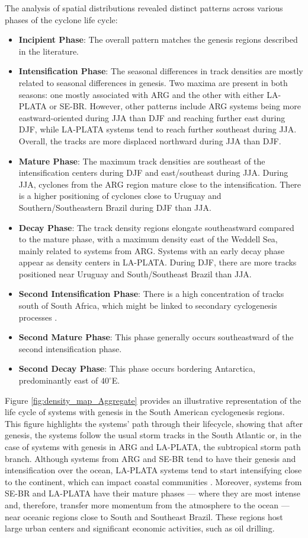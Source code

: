 The analysis of spatial distributions revealed distinct patterns across various phases of the cyclone life cycle:
\begin{itemize}
    \item \textbf{Incipient Phase}: The overall pattern matches the genesis regions described in the literature.
    \item \textbf{Intensification Phase}: The seasonal differences in track densities are mostly related to seasonal differences in genesis. Two maxima are present in both seasons: one mostly associated with ARG and the other with either LA-PLATA or SE-BR. However, other patterns include ARG systems being more eastward-oriented during JJA than DJF and reaching further east during DJF, while LA-PLATA systems tend to reach further southeast during JJA. Overall, the tracks are more displaced northward during JJA than DJF.
    \item \textbf{Mature Phase}: The maximum track densities are southeast of the intensification centers during DJF and east/southeast during JJA. During JJA, cyclones from the ARG region mature close to the intensification. There is a higher positioning of cyclones close to Uruguay and Southern/Southeastern Brazil during DJF than JJA.
    \item \textbf{Decay Phase}: The track density regions elongate southeastward compared to the mature phase, with a maximum density east of the Weddell Sea, mainly related to systems from ARG. Systems with an early decay phase appear as density centers in LA-PLATA. During DJF, there are more tracks positioned near Uruguay and South/Southeast Brazil than JJA.
    \item \textbf{Second Intensification Phase}: There is a high concentration of tracks south of South Africa, which might be linked to secondary cyclogenesis processes \citep{Mailier_2006, Shapiro_1997, Ford_1990, Rivals_1998}.
    \item \textbf{Second Mature Phase}: This phase generally occurs southeastward of the second intensification phase.
    \item \textbf{Second Decay Phase}: This phase occurs bordering Antarctica, predominantly east of \(40^\circ\)E.
\end{itemize}

Figure \ref{fig:density_map_Aggregate} provides an illustrative representation of the life cycle of systems with genesis in the South American cyclogenesis regions. This figure highlights the systems' path through their lifecycle, showing that after genesis, the systems follow the usual storm tracks in the South Atlantic or, in the case of systems with genesis in ARG and LA-PLATA, the subtropical storm path branch. Although systems from ARG and SE-BR tend to have their genesis and intensification over the ocean, LA-PLATA systems tend to start intensifying close to the continent, which can impact coastal communities \citep{de2021ocean}. Moreover, systems from SE-BR and LA-PLATA have their mature phases — where they are most intense and, therefore, transfer more momentum from the atmosphere to the ocean — near oceanic regions close to South and Southeast Brazil. These regions host large urban centers and significant economic activities, such as oil drilling.

